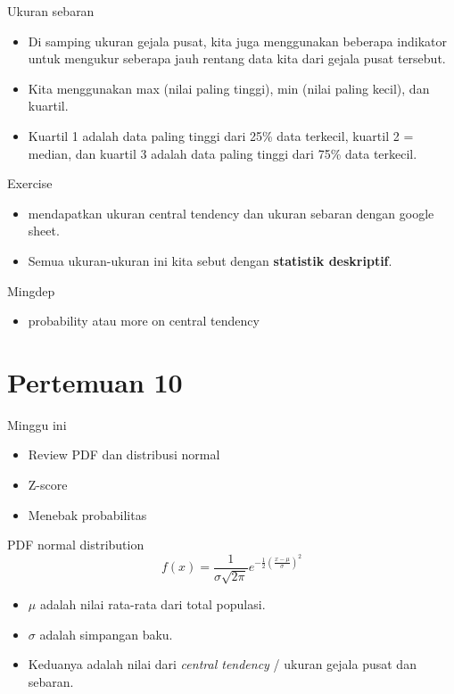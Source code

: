 \documentclass[
  ignorenonframetext,
]{beamer}
\providecommand{\tightlist}{%
  \setlength{\itemsep}{0pt}\setlength{\parskip}{0pt}}\usepackage{longtable,booktabs,array}
\begin{document}
\begin{frame}{Ukuran sebaran}
\label{ukuran-sebaran}
\begin{itemize}
\item
  Di samping ukuran gejala pusat, kita juga menggunakan beberapa
  indikator untuk mengukur seberapa jauh rentang data kita dari gejala
  pusat tersebut.
\item
  Kita menggunakan max (nilai paling tinggi), min (nilai paling kecil),
  dan kuartil.
\item
  Kuartil 1 adalah data paling tinggi dari 25\% data terkecil, kuartil 2
  = median, dan kuartil 3 adalah data paling tinggi dari 75\% data
  terkecil.
\end{itemize}
\end{frame}

\begin{frame}{Exercise}
\label{exercise-1}
\begin{itemize}
\item
  mendapatkan ukuran central tendency dan ukuran sebaran dengan google
  sheet.
\item
  Semua ukuran-ukuran ini kita sebut dengan \textbf{statistik
  deskriptif}.
\end{itemize}
\end{frame}

\begin{frame}{Mingdep}
\label{mingdep-2}
\begin{itemize}
\tightlist
\item
  probability atau more on central tendency
\end{itemize}
\end{frame}

\section{Pertemuan 10}\label{pertemuan-10}

\begin{frame}{Minggu ini}
\label{minggu-ini-1}
\begin{itemize}
\item
  Review PDF dan distribusi normal
\item
  Z-score
\item
  Menebak probabilitas
\end{itemize}
\end{frame}

\begin{frame}{PDF normal distribution}
\label{pdf-normal-distribution}
\[
f(x)=\frac{1}{\sigma \sqrt{2\pi}}e^{-\frac{1}{2}\left(\frac{x-\mu}{\sigma}\right)^2}
\]

\begin{itemize}
\item
  \(\mu\) adalah nilai rata-rata dari total populasi.
\item
  \(\sigma\) adalah simpangan baku.
\item
  Keduanya adalah nilai dari \emph{central tendency} / ukuran gejala
  pusat dan sebaran.
\end{itemize}
\end{frame}
\end{document}
